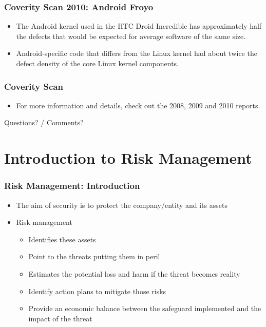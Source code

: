 \documentclass{beamer}
\begin{document}

\begin{frame}
\frametitle{Coverity Scan 2010: Android Froyo}
\begin{itemize}
\item The Android kernel used in the HTC Droid Incredible has approximately half the defects that would be expected for average software of the same size.
\item Android-specific code that differs from the Linux kernel had about twice the defect density of the core Linux kernel components.
\end{itemize}
\end{frame}



\begin{frame}
\frametitle{Coverity Scan}
\begin{itemize}
\item For more information and details, check out the 2008, 2009 and 2010 reports.
\end{itemize}
\begin{center}
\huge{Questions? / Comments?}
\end{center}
\end{frame}



\section{Introduction to Risk Management}

\begin{frame}
\frametitle{Risk Management: Introduction}
\begin{itemize}
\item The aim of security is to protect the company/entity and its assets
\item Risk management
  \begin{itemize}
  \item Identifies these assets
  \item Point to the threats putting them in peril
  \item Estimates the potential loss and harm if the threat becomes reality
  \item Identify action plans to mitigate those risks
  \item Provide an economic balance between the safeguard implemented and the impact of the threat
  \end{itemize}
\end{itemize}
\end{frame}
\end{document}
